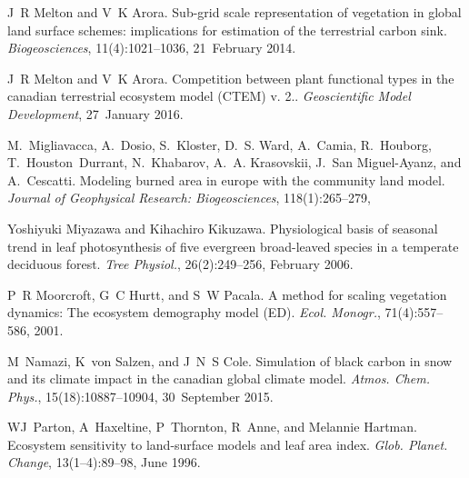 \begin{DoxyDescription}
\item[\label{_CITEREF_Melton2014-xy}%
\mbox{[}40\mbox{]}]J~R Melton and V~K Arora. Sub-\/grid scale representation of vegetation in global land surface schemes\+: implications for estimation of the terrestrial carbon sink. {\itshape Biogeosciences}, 11(4)\+:1021--1036, 21~February 2014. 


\item[\label{_CITEREF_Melton2016-zx}%
\mbox{[}41\mbox{]}]J~R Melton and V~K Arora. Competition between plant functional types in the canadian terrestrial ecosystem model (C\+T\+E\+M) v. 2.. {\itshape Geoscientific Model Development}, 27~January 2016. 


\item[\label{_CITEREF_Migliavacca2013-eh}%
\mbox{[}42\mbox{]}]M.~Migliavacca, A.~Dosio, S.~Kloster, D.~S. Ward, A.~Camia, R.~Houborg, T.~Houston~Durrant, N.~Khabarov, A.~A. Krasovskii, J.~San Miguel-\/\+Ayanz, and A.~Cescatti. Modeling burned area in europe with the community land model. {\itshape Journal of Geophysical Research\+: Biogeosciences}, 118(1)\+:265--279,
\begin{DoxyEnumerate}
\item 
\end{DoxyEnumerate}


\item[\label{_CITEREF_Miyazawa2006-so}%
\mbox{[}43\mbox{]}]Yoshiyuki Miyazawa and Kihachiro Kikuzawa. Physiological basis of seasonal trend in leaf photosynthesis of five evergreen broad-\/leaved species in a temperate deciduous forest. {\itshape Tree Physiol.}, 26(2)\+:249--256, February 2006.


\item[\label{_CITEREF_Moorcroft2001-co}%
\mbox{[}44\mbox{]}]P~R Moorcroft, G~C Hurtt, and S~W Pacala. A method for scaling vegetation dynamics\+: The ecosystem demography model (E\+D). {\itshape Ecol. Monogr.}, 71(4)\+:557--586, 2001. 


\item[\label{_CITEREF_Namazi2015-wz}%
\mbox{[}45\mbox{]}]M~Namazi, K~von Salzen, and J~N~S Cole. Simulation of black carbon in snow and its climate impact in the canadian global climate model. {\itshape Atmos. Chem. Phys.}, 15(18)\+:10887--10904, 30~September 2015. 


\item[\label{_CITEREF_Parton1996-zv}%
\mbox{[}46\mbox{]}]W\+J~Parton, A~Haxeltine, P~Thornton, R~Anne, and Melannie Hartman. Ecosystem sensitivity to land-\/surface models and leaf area index. {\itshape Glob. Planet. Change}, 13(1–4)\+:89--98, June 1996. 



\end{DoxyDescription}
